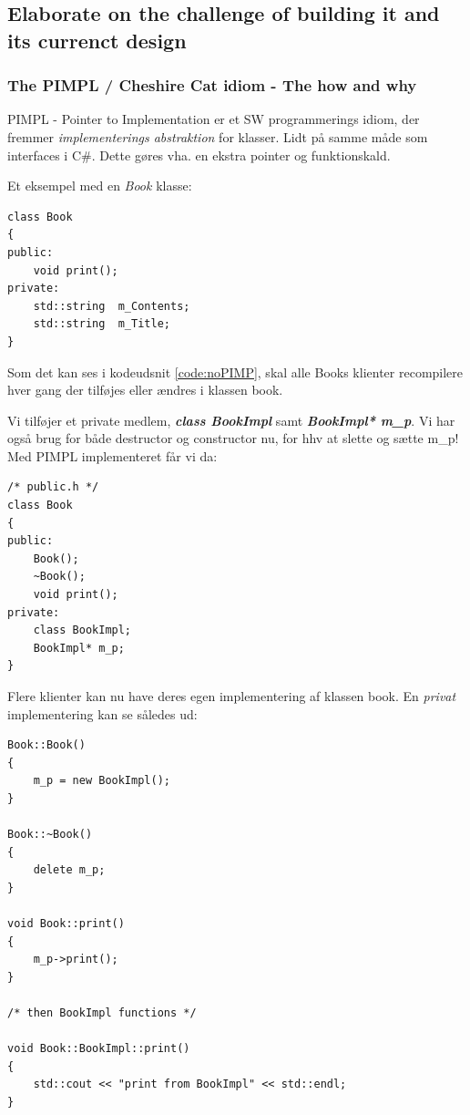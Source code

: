 \subsection{Elaborate on the challenge of building it and its currenct design}

\subsubsection{The PIMPL / Cheshire Cat idiom - The how and why}

PIMPL - Pointer to Implementation er et SW programmerings idiom, der fremmer \textit{implementerings abstraktion} for klasser. Lidt på samme måde som interfaces i C\#. Dette gøres vha. en ekstra pointer og funktionskald.

Et eksempel med en \textit{Book} klasse:

\begin{lstlisting}[caption=Klassen Book uden PIMPL, label=code:noPIMP]
class Book
{
public:
	void print();
private:
	std::string  m_Contents;
	std::string  m_Title;
}
\end{lstlisting}

Som det kan ses i kodeudsnit \ref{code:noPIMP}, skal alle Books klienter recompilere hver gang der tilføjes eller ændres i klassen book.

Vi tilføjer et private medlem, \textbf{\textit{class BookImpl}} samt \textbf{\textit{BookImpl* m\_p}}. Vi har også brug for både destructor og constructor nu, for hhv at slette og sætte m\_p! Med PIMPL implementeret får vi da:

\begin{lstlisting}[caption=Klassen Book med PIMPL implementeret, label=code:PIMP]
/* public.h */
class Book
{
public:
	Book();
	~Book();
	void print();
private:
	class BookImpl;
	BookImpl* m_p;
}
\end{lstlisting}

Flere klienter kan nu have deres egen implementering af klassen book. En \textit{privat} implementering kan se således ud:

\begin{lstlisting}[caption=Privat implementering af klassen Book, label=code:PIMP]
Book::Book()
{
	m_p = new BookImpl();
}

Book::~Book()
{
	delete m_p;
}

void Book::print()
{
	m_p->print();
}

/* then BookImpl functions */

void Book::BookImpl::print()
{
	std::cout << "print from BookImpl" << std::endl;
}
\end{lstlisting}

